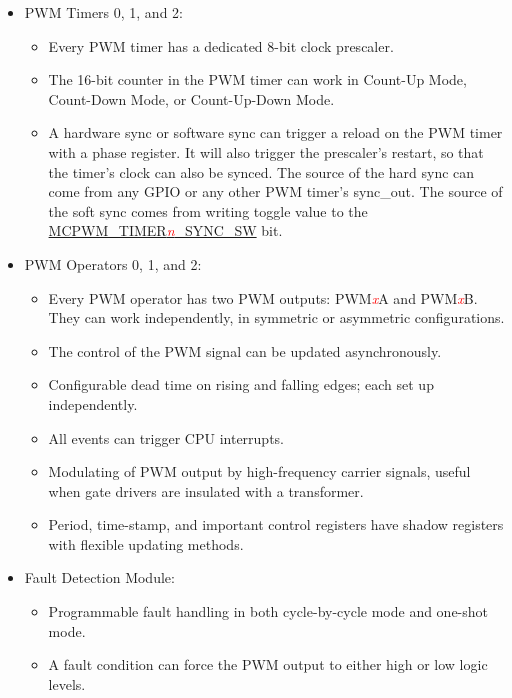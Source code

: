 \documentclass[main\_\_EN.tex]{subfiles}
\begin{document}
\begin{itemize}
    \item PWM Timers 0, 1, and 2:
        \begin{itemize}
            \item Every PWM timer has a dedicated 8-bit clock prescaler.
            \item The 16-bit counter in the PWM timer can work in Count-Up Mode, Count-Down Mode, or Count-Up-Down Mode.
            \item A hardware sync or software sync can trigger a reload on the PWM timer with a phase register. It will also trigger the prescaler's restart, so that the timer's clock can also be synced. The source of the hard sync can come from any GPIO or any other PWM timer's sync\_out. The source of the soft sync comes from writing toggle value to the \hyperref[fielddesc:MCPWMTIMERNSYNCSW]{MCPWM\_TIMER\textcolor{red}{\it{n}}\_SYNC\_SW} bit.
        \end{itemize}
    \item PWM Operators 0, 1, and 2:
        \begin{itemize}
            \item Every PWM operator has two PWM outputs: PWM\textcolor{red}{\it{x}}A and PWM\textcolor{red}{\it{x}}B. They can work independently, in symmetric or asymmetric configurations.
            \item The control of the PWM signal can be updated asynchronously.
            \item Configurable dead time on rising and falling edges; each set up independently.
            \item All events can trigger CPU interrupts.
            \item Modulating of PWM output by high-frequency carrier signals, useful when gate drivers are insulated with a transformer.
            \item Period, time-stamp, and important control registers have shadow registers with flexible updating methods.
        \end{itemize}
    \item Fault Detection Module:
        \begin{itemize}
            \item Programmable fault handling in both cycle-by-cycle mode and one-shot mode.
            \item A fault condition can force the PWM output to either high or low logic levels.
        \end{itemize}

\end{itemize}
\end{document}
